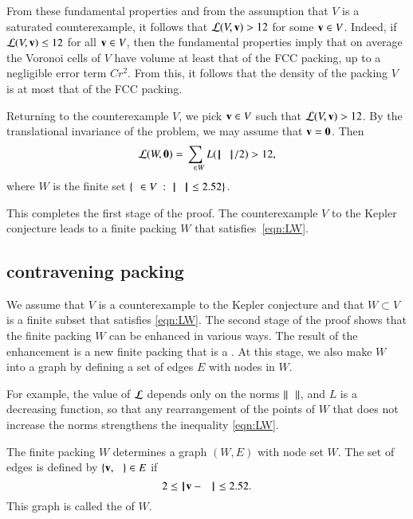 From these fundamental properties and from the assumption that $V$ is a saturated counterexample,
it follows that ${\mathcal L}(V,{\mathbf v})>12$ for some ${\mathbf v}\in V$.  Indeed, if ${\mathcal L}(V,{\mathbf v})\le 12$ for all
${\mathbf v}\in V$, then the fundamental properties
imply that on average the Voronoi cells of $V$ have volume at least that of the FCC packing, up to a negligible error term $C r^2$.  From this, it follows that the density
of the packing $V$ is at most that of the FCC packing.



Returning to the counterexample $V$, we pick ${\mathbf v}\in V$ such that
${\mathcal L}(V,{\mathbf v})>12$.  By the translational invariance of the problem, we
may assume that ${\mathbf v}={\mathbf 0}$.  Then
\begin{equation}\label{eqn:LW}
\CalL(W,\orz) = \sum_{\w\in W} L(\normo{\w}/2)  > 12,
\end{equation}
where $W$ is the finite set  $\{\w\in V\mid \normo{\w} \le 2.52\}$.

This completes the first stage of the proof.
The counterexample $V$ to the Kepler conjecture leads to a finite packing $W$
that satisfies~\eqref{eqn:LW}.

\subsection{contravening packing}

We assume that $V$ is a counterexample to the Kepler conjecture and that $W\subset V$
is a finite subset that satisfies \eqref{eqn:LW}.
The second stage of the proof shows that the 
finite packing $W$ can be enhanced in various ways.  The result of the enhancement is
a new finite packing that is a .  At this stage, we also
make $W$ into a graph by defining a set of edges $E$ with nodes in $W$.

For example, the value of ${\mathcal L}$
depends only on the norms $\normo{\w}$, and $L$ is a decreasing
function, so that any rearrangement of the points of $W$ that does not
increase the norms strengthens the inequality \eqref{eqn:LW}.

The finite packing $W$ determines a graph $(W,E)$ with node set $W$.  The set
of edges is defined by $\{{\mathbf v},\hskip0.65em\}\in E$ if 
\[2\le\norm{\v}{\w}\le 2.52.\] This graph is called the  of $W$.

